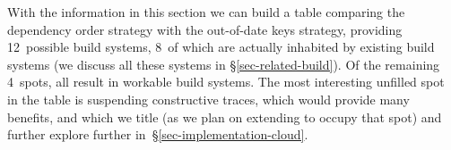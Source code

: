 With the information in this section we can build a table comparing the
dependency order strategy with the out-of-date keys strategy, providing 12~possible
build systems, 8~of which are actually inhabited by existing build systems
(we discuss all these systems in \S\ref{sec-related-build}). Of the
remaining 4~spots, all result in workable build systems. The most interesting
unfilled spot in the table is suspending constructive traces, which would provide
many benefits, and which we title \Cloud \Shake (as we plan on extending \Shake to occupy that spot)
and further explore further in~\S\ref{sec-implementation-cloud}.

